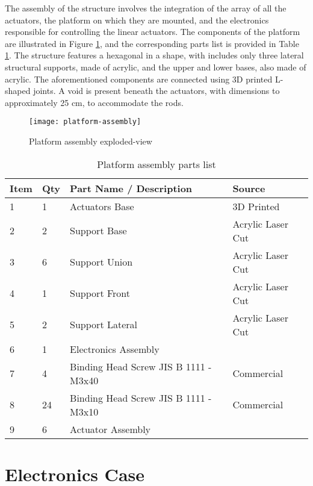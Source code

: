 The assembly of the structure involves the integration of the array of all the actuators, the platform on which they are mounted, and the electronics responsible for controlling the linear actuators. The components of the platform are illustrated in Figure \ref{fig:platform-assembly}, and the corresponding parts list is provided in Table \ref{tab:platform-assembly}. The structure features a hexagonal in a shape, with includes only three lateral structural supports, made of acrylic, and the upper and lower bases, also made of acrylic. The aforementioned components are connected using 3D printed L-shaped joints. A void is present beneath the actuators, with dimensions to approximately 25 cm, to accommodate the rods.


\begin{figure}[!hbt]
    \centering
    \texttt{[image: platform-assembly]}
    \caption{Platform assembly exploded-view}
    \label{fig:platform-assembly}
\end{figure}
\begin{table}[!hbt]
    \centering
    \caption{Platform assembly parts list}
    \label{tab:platform-assembly}
    \begin{tabular}{llll}
    \toprule
    Item & Qty & Part Name / Description & Source \\
    \midrule
    1 & 1 & Actuators Base & 3D Printed \\
    2 & 2 & Support Base & Acrylic Laser Cut \\
    3 & 6 & Support Union & Acrylic Laser Cut \\
    4 & 1 & Support Front & Acrylic Laser Cut \\
    5 & 2 & Support Lateral & Acrylic Laser Cut \\
    6 & 1 & Electronics Assembly & \\
    7 & 4 & Binding Head Screw JIS B 1111 - M3x40 & Commercial \\
    8 & 24 & Binding Head Screw JIS B 1111 - M3x10 & Commercial \\
    9 & 6 & Actuator Assembly & \\
    \bottomrule
    \end{tabular}
\end{table}


\section{Electronics Case}

